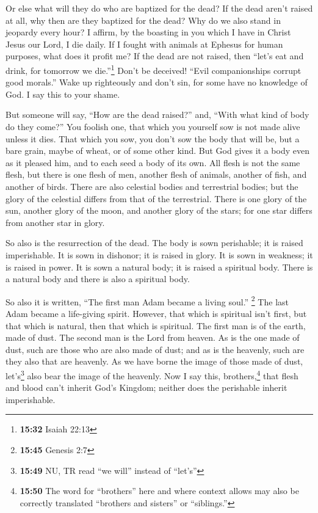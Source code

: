  Or else what will they do who are baptized for the dead?
If the dead aren't raised at all, why then are they baptized for the
dead?  Why do we also stand in jeopardy every hour?
 I affirm, by the boasting in you which I have in Christ
Jesus our Lord, I die daily.  If I fought with animals at
Ephesus for human purposes, what does it profit me? If the dead are not
raised, then ``let's eat and drink, for tomorrow we die.''\footnote{\textbf{15:32}
  Isaiah 22:13}  Don't be deceived! ``Evil companionships
corrupt good morals.''  Wake up righteously and don't
sin, for some have no knowledge of God. I say this to your shame.

 But someone will say, ``How are the dead raised?'' and,
``With what kind of body do they come?''  You foolish
one, that which you yourself sow is not made alive unless it dies.
 That which you sow, you don't sow the body that will be,
but a bare grain, maybe of wheat, or of some other kind. 
But God gives it a body even as it pleased him, and to each seed a body
of its own.  All flesh is not the same flesh, but there
is one flesh of men, another flesh of animals, another of fish, and
another of birds.  There are also celestial bodies and
terrestrial bodies; but the glory of the celestial differs from that of
the terrestrial.  There is one glory of the sun, another
glory of the moon, and another glory of the stars; for one star differs
from another star in glory.

 So also is the resurrection of the dead. The body is
sown perishable; it is raised imperishable.  It is sown
in dishonor; it is raised in glory. It is sown in weakness; it is raised
in power.  It is sown a natural body; it is raised a
spiritual body. There is a natural body and there is also a spiritual
body.

 So also it is written, ``The first man Adam became a
living soul.'' \footnote{\textbf{15:45} Genesis 2:7} The last Adam
became a life-giving spirit.  However, that which is
spiritual isn't first, but that which is natural, then that which is
spiritual.  The first man is of the earth, made of dust.
The second man is the Lord from heaven.  As is the one
made of dust, such are those who are also made of dust; and as is the
heavenly, such are they also that are heavenly.  As we
have borne the image of those made of dust, let's\footnote{\textbf{15:49}
  NU, TR read ``we will'' instead of ``let's''} also bear the image of
the heavenly.  Now I say this, brothers,\footnote{\textbf{15:50}
  The word for ``brothers'' here and where context allows may also be
  correctly translated ``brothers and sisters'' or ``siblings.''} that
flesh and blood can't inherit God's Kingdom; neither does the perishable
inherit imperishable.

